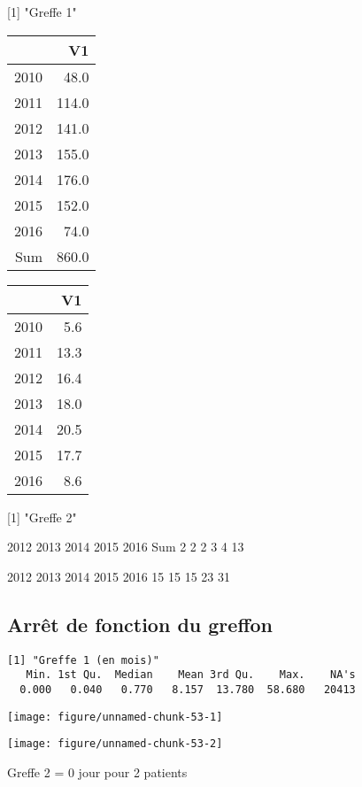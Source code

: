 \documentclass[11pt,a4paper]{article}\usepackage[]{graphicx}\usepackage[]{color}
\makeatletter
\def\maxwidth{ %
  \ifdim\Gin@nat@width>\linewidth
    \linewidth
  \else
    \Gin@nat@width
  \fi
}
\newenvironment{kframe}{%
 \def\at@end@of@kframe{}%
 \ifinner\ifhmode%
  \def\at@end@of@kframe{\end{minipage}}%
  \begin{minipage}{\columnwidth}%
 \fi\fi%
 \def\FrameCommand##1{\hskip\@totalleftmargin \hskip-\fboxsep
 \colorbox{shadecolor}{##1}\hskip-\fboxsep
     \hskip-\linewidth \hskip-\@totalleftmargin \hskip\columnwidth}%
 \MakeFramed {\advance\hsize-\width
   \@totalleftmargin\z@ \linewidth\hsize
   \@setminipage}}%
 {\par\unskip\endMakeFramed%
 \at@end@of@kframe}
\newenvironment{knitrout}{}{} %
\makeatother
\begin{document}
[1] "Greffe 1"
\begin{table}[H]
\centering
\begin{tabular}{rr}
  \hline
 & V1 \\ 
  \hline
2010 & 48.0 \\ 
  2011 & 114.0 \\ 
  2012 & 141.0 \\ 
  2013 & 155.0 \\ 
  2014 & 176.0 \\ 
  2015 & 152.0 \\ 
  2016 & 74.0 \\ 
  Sum & 860.0 \\ 
   \hline
\end{tabular}
\end{table}
\begin{table}[H]
\centering
\begin{tabular}{rr}
  \hline
 & V1 \\ 
  \hline
2010 & 5.6 \\ 
  2011 & 13.3 \\ 
  2012 & 16.4 \\ 
  2013 & 18.0 \\ 
  2014 & 20.5 \\ 
  2015 & 17.7 \\ 
  2016 & 8.6 \\ 
   \hline
\end{tabular}
\end{table}
[1] "Greffe 2"

2012 2013 2014 2015 2016  Sum 
   2    2    2    3    4   13 

2012 2013 2014 2015 2016 
  15   15   15   23   31 



  \subsection{Arrêt de fonction du greffon}
  
\begin{knitrout}
\color{fgcolor}\begin{kframe}
\begin{verbatim}
[1] "Greffe 1 (en mois)"
   Min. 1st Qu.  Median    Mean 3rd Qu.    Max.    NA's 
  0.000   0.040   0.770   8.157  13.780  58.680   20413 
\end{verbatim}
\end{kframe}
\texttt{[image: figure/unnamed-chunk-53-1]} 

\texttt{[image: figure/unnamed-chunk-53-2]} 

\end{knitrout}
Greffe 2 = 0 jour pour 2 patients
~\\
\end{document}
